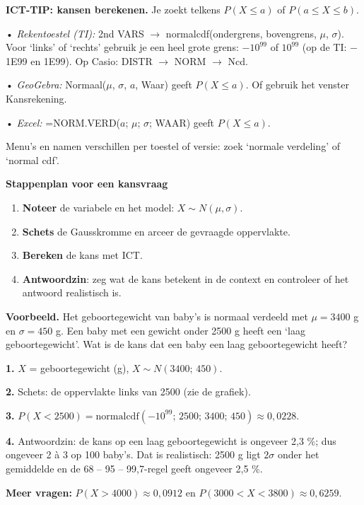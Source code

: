 \begin{ict}
\textbf{ICT-TIP: kansen berekenen.} Je zoekt telkens $P(X\le a)$ of $P(a\le X\le b)$.

• \emph{Rekentoestel (TI):} 2nd VARS $\rightarrow$ normalcdf(ondergrens, bovengrens, $\mu$, $\sigma$). Voor ‘links’ of ‘rechts’ gebruik je een heel grote grens: $-10^{99}$ of $10^{99}$ (op de TI: $-$1E99 en 1E99). Op Casio: DISTR $\rightarrow$ NORM $\rightarrow$ Ncd.

• \emph{GeoGebra:} Normaal($\mu$, $\sigma$, $a$, Waar) geeft $P(X\le a)$. Of gebruik het venster Kansrekening.

• \emph{Excel:} =NORM.VERD($a$; $\mu$; $\sigma$; WAAR) geeft $P(X\le a)$.

Menu’s en namen verschillen per toestel of versie: zoek ‘normale verdeling’ of ‘normal cdf’.
\end{ict}

\begin{theorie}
\textbf{Stappenplan voor een kansvraag}

\begin{enumerate}
\item \textbf{Noteer} de variabele en het model: $X\sim N(\mu,\sigma)$.
\item \textbf{Schets} de Gausskromme en arceer de gevraagde oppervlakte.
\item \textbf{Bereken} de kans met ICT.
\item \textbf{Antwoordzin}: zeg wat de kans betekent in de context en controleer of het antwoord realistisch is.
\end{enumerate}
\end{theorie}

\begin{voorbeeld}
\textbf{Voorbeeld.} Het geboortegewicht van baby’s is normaal verdeeld met $\mu=3400$ g en $\sigma=450$ g. Een baby met een gewicht onder 2500 g heeft een ‘laag geboortegewicht’. Wat is de kans dat een baby een laag geboortegewicht heeft?

\textbf{1.} $X$ = geboortegewicht (g), $X\sim N(3400;\,450)$.

\textbf{2.} Schets: de oppervlakte links van 2500 (zie de grafiek).

\textbf{3.} $P(X<2500)=\text{normalcdf}(-10^{99};\,2500;\,3400;\,450)\approx 0{,}0228$.

\textbf{4.} Antwoordzin: de kans op een laag geboortegewicht is ongeveer 2,3 \%; dus ongeveer 2 à 3 op 100 baby’s. Dat is realistisch: 2500 g ligt $2\sigma$ onder het gemiddelde en de 68 – 95 – 99,7-regel geeft ongeveer 2,5 \%.

\textbf{Meer vragen:} $P(X>4000)\approx 0{,}0912$ \quad en \quad $P(3000<X<3800)\approx 0{,}6259$.
\end{voorbeeld}

